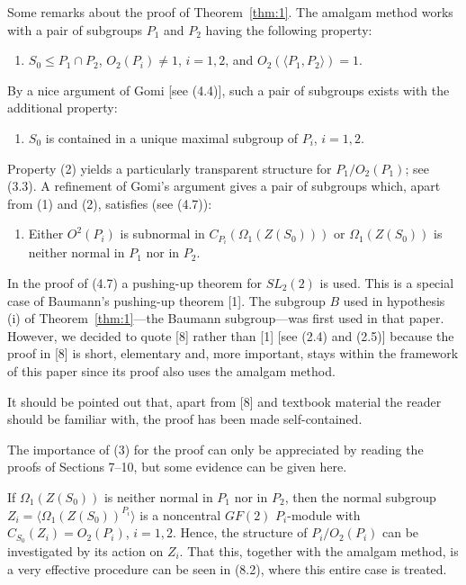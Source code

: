 \documentclass[11pt]{article}
\theoremstyle{plain}
\theoremstyle{stmplain}
\begin{document}
\noindent Some remarks about the proof of Theorem~\ref{thm:1}. The amalgam method
works with a pair of subgroups $P_1$ and $P_2$ having the following property:
\begin{enumerate}
\item[(1)] $S_0 \le P_1 \cap P_2$, $O_2(P_i) \ne 1$, $i = 1,2$, and $O_2(\langle P_1, P_2 \rangle) = 1$.
\end{enumerate}

\noindent By a nice argument of Gomi [see (4.4)], such a pair of subgroups exists
with the additional property:
\begin{enumerate}
\item[(2)] $S_0$ is contained in a unique maximal subgroup of $P_i$, $i = 1, 2$.
\end{enumerate}

\noindent Property (2) yields a particularly transparent structure for
$P_1/O_2(P_1)$; see (3.3). A refinement of Gomi's argument gives a pair of
subgroups which, apart from (1) and (2), satisfies (see (4.7)):
\begin{enumerate}
\item[(3)] Either $O^2(P_i)$ is subnormal in $C_{P_i}(\Omega_1(Z(S_0)))$ or
  $\Omega_1(Z(S_0))$ is neither normal in $P_1$ nor in $P_2$.
\end{enumerate}

\noindent In the proof of (4.7) a pushing-up theorem for $SL_2(2)$ is used. This is
a special case of Baumann's pushing-up theorem [1]. The subgroup $B$ used in
hypothesis (i) of Theorem~\ref{thm:1}---the Baumann subgroup---was first used in
that paper. However, we decided to quote [8] rather than [1] [see (2.4) and
(2.5)] because the proof in [8] is short, elementary and, more important, stays
within the framework of this paper since its proof also uses the amalgam
method.

\noindent It should be pointed out that, apart from [8] and textbook material the
reader should be familiar with, the proof has been made self-contained.

\noindent The importance of (3) for the proof can only be appreciated by reading
the proofs of Sections 7--10, but some evidence can be given here.

\noindent If $\Omega_1(Z(S_0))$ is neither normal in $P_1$ nor in $P_2$, then the
normal subgroup $Z_i = \langle \Omega_1(Z(S_0))^{P_i} \rangle$ is a noncentral
$GF(2)$ $P_i$-module with $C_{S_0}(Z_i) = O_2(P_i)$, $i = 1, 2$. Hence, the
structure of $P_i/O_2(P_i)$ can be investigated by its action on $Z_i$. That
this, together with the amalgam method, is a very effective procedure can be
seen in (8.2), where this entire case is treated.
\end{document}

